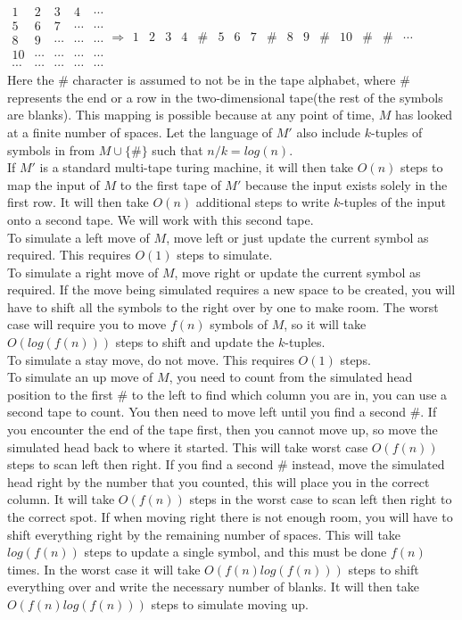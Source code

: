 \documentclass{assignment}
\begin{document}
\begin{problemlist}
\begin{answer}
$\begin{smallmatrix}
1 & 2 & 3 & 4 & \cdots\\
5 & 6 & 7 & \cdots & \cdots\\
8 & 9 & \cdots & \cdots & \cdots\\
10 & \cdots & \cdots & \cdots & \cdots\\
\cdots & \cdots & \cdots & \cdots & \cdots
\end{smallmatrix}
\Rightarrow
\begin{smallmatrix}
1 & 2 & 3 & 4 & \# & 5 & 6 & 7 & \# & 8 & 9 & \# & 10 & \# & \# &\cdots
\end{smallmatrix}$
\\
Here the $\#$ character is assumed to not be in the tape alphabet, where $\#$ represents the end or a row in the two-dimensional tape(the rest of the symbols are blanks). This mapping is possible because at any point of time, $M$ has looked at a finite number of spaces. Let the language of $M'$ also include $k$-tuples of symbols in from $M\cup \{ \# \}$ such that $n/k=log(n)$.\\
If $M'$ is a standard multi-tape turing machine, it will then take $O(n)$ steps to map the input of $M$ to the first tape of $M'$ because the input exists solely in the first row. It will then take $O(n)$ additional steps to write $k$-tuples of the input onto a second tape. We will work with this second tape.\\
To simulate a left move of $M$, move left or just update the current symbol as required. This requires $O(1)$ steps to simulate.\\
To simulate a right move of $M$, move right or update the current symbol as required. If the move being simulated requires a new space to be created, you will have to shift all the symbols to the right over by one to make room. The worst case will require you to move $f(n)$ symbols of $M$, so it will take $O(log(f(n)))$ steps to shift and update the $k$-tuples.\\
To simulate a stay move, do not move. This requires $O(1)$ steps.\\
To simulate an up move of $M$, you need to count from the simulated head position to the first $\#$ to the left to find which column you are in, you can use a second tape to count. You then need to move left until you find a second $\#$. If you encounter the end of the tape first, then you cannot move up, so move the simulated head back to where it started. This will take worst case $O(f(n))$ steps to scan left then right. If you find a second $\#$ instead, move the simulated head right by the number that you counted, this will place you in the correct column. It will take $O(f(n))$ steps in the worst case to scan left then right to the correct spot. If when moving right there is not enough room, you will have to shift everything right by the remaining number of spaces. This will take $log(f(n))$ steps to update a single symbol, and this must be done $f(n)$ times. In the worst case it will take $O(f(n)log(f(n)))$ steps to shift everything over and write the necessary number of blanks. It will then take $O(f(n)log(f(n)))$ steps to simulate moving up.\\

\end{answer}
\end{problemlist}
\end{document}
